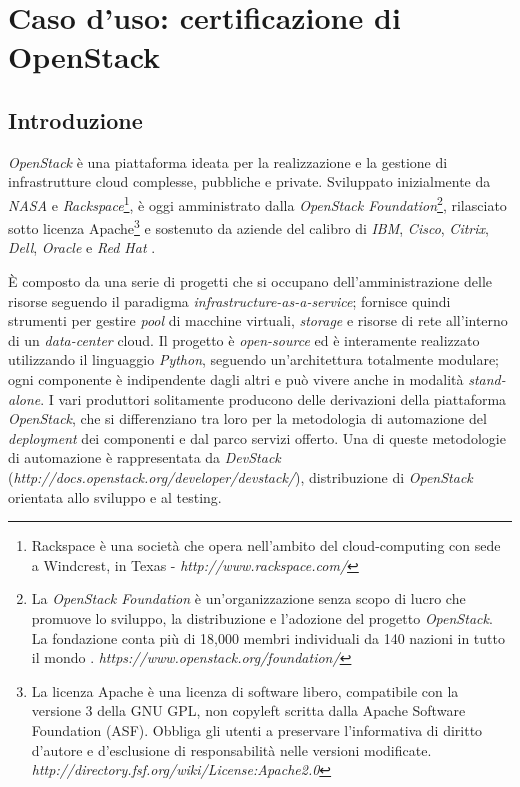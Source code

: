 \documentclass[../main.tex]{subfiles}
\begin{document}
\chapter{Caso d'uso: certificazione di OpenStack}
\section{Introduzione}
\textit{OpenStack} è una piattaforma ideata per la realizzazione e la gestione di infrastrutture cloud complesse, pubbliche e private.
Sviluppato inizialmente da \textit{NASA} e \textit{Rackspace}\footnote{Rackspace è una società che opera nell'ambito del cloud-computing con sede a Windcrest, in Texas - \textit{http://www.rackspace.com/}}, è oggi amministrato dalla \textit{OpenStack Foundation}\footnote{La \textit{OpenStack Foundation} è un'organizzazione senza scopo di lucro che promuove lo sviluppo, la distribuzione e l'adozione del progetto \textit{OpenStack}. La fondazione conta più di 18,000 membri individuali da 140 nazioni in tutto il mondo \cite{OpenstackFoundation}. \textit{https://www.openstack.org/foundation/} }, rilasciato sotto licenza Apache\footnote{La licenza Apache è una licenza di software libero, compatibile con la versione 3 della GNU GPL, non copyleft scritta dalla Apache Software Foundation (ASF). Obbliga gli utenti a preservare l'informativa di diritto d'autore e d'esclusione di responsabilità nelle versioni modificate. \textit{http://directory.fsf.org/wiki/License:Apache2.0}} e sostenuto da aziende del calibro di \textit{IBM}, \textit{Cisco}, \textit{Citrix}, \textit{Dell}, \textit{Oracle} e \textit{Red Hat} \cite{OpenstackWhatIs}.

\`E composto da una serie di progetti che si occupano dell'amministrazione delle risorse seguendo il paradigma \textit{infrastructure-as-a-service}; fornisce quindi strumenti per gestire \textit{pool} di macchine virtuali, \textit{storage} e risorse di rete all'interno di un \textit{data-center} cloud.
Il progetto è \textit{open-source} ed è interamente realizzato utilizzando il linguaggio \textit{Python}, seguendo un'architettura totalmente modulare; ogni componente è indipendente dagli altri e può vivere anche in modalità \textit{stand-alone}.
I vari produttori solitamente producono delle derivazioni della piattaforma \textit{OpenStack}, che si differenziano tra loro per la metodologia di automazione del \textit{deployment} dei componenti e dal parco servizi offerto. Una di queste metodologie di automazione è rappresentata da \textit{DevStack} (\textit{http://docs.openstack.org/developer/devstack/}), distribuzione di \textit{OpenStack} orientata allo sviluppo e al testing.
\end{document}
